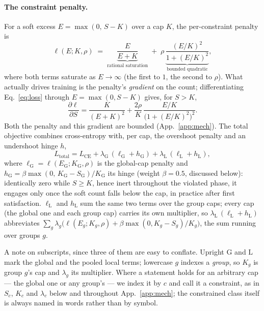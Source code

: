 \documentclass[10pt]{article}
\begin{document}
\paragraph{The constraint penalty.}
For a soft excess $E = \max(0,\, S - K)$ over a cap $K$, the per-constraint
penalty is
\begin{equation}
\label{eq:loss}
\ell(E;K,\rho)\;=\;\underbrace{\frac{E}{E+K}}_{\text{rational saturation}}
\;+\;\rho\,\underbrace{\frac{(E/K)^2}{1+(E/K)^2}}_{\text{bounded quadratic}} ,
\end{equation}
where both terms saturate as $E\!\to\!\infty$ (the first to $1$, the second
to $\rho$). What actually drives training is the penalty's \emph{gradient}
on the count; differentiating Eq.~\eqref{eq:loss} through $E=\max(0,S-K)$
gives, for $S>K$,
\begin{equation}
\label{eq:grad}
\frac{\partial \ell}{\partial S}
= \frac{K}{(E+K)^2} + \frac{2\rho}{K}\,\frac{E/K}{\bigl(1+(E/K)^2\bigr)^2}.
\end{equation}
Both the penalty and this gradient are bounded (App.~\ref{app:mech}). The
total objective combines cross-entropy with, per cap, the overshoot penalty
and an undershoot hinge $h$,
\begin{equation}
\label{eq:total}
L_{\text{total}} = L_{\text{CE}} + \lambda_{\mathrm{G}}\,(\ell_{\mathrm{G}} + h_{\mathrm{G}}) + \lambda_{\mathrm{L}}\,(\ell_{\mathrm{L}} + h_{\mathrm{L}}) ,
\end{equation}
where $\ell_{\mathrm{G}}=\ell(E_{\mathrm{G}};K_{\mathrm{G}},\rho)$ is the global-cap penalty and
$h_{\mathrm{G}}=\beta\max(0,\,K_{\mathrm{G}}-S_{\mathrm{G}})/K_{\mathrm{G}}$ its hinge (weight $\beta{=}0.5$, discussed below):
identically zero while $S\ge K$, hence inert throughout the violated phase,
it engages only once the soft count falls below the cap, in practice after
first satisfaction. $\ell_{\mathrm{L}}$ and $h_{\mathrm{L}}$ sum the same two terms over the
group caps; every cap (the global one and each group cap) carries its own
multiplier, so $\lambda_{\mathrm{L}}\,(\ell_{\mathrm{L}}+h_{\mathrm{L}})$ abbreviates
$\sum_g \lambda_g\bigl(\ell(E_g;K_g,\rho)+\beta\max(0,K_g-S_g)/K_g\bigr)$, the sum running over groups $g$.

{A note on subscripts, since three of them are easy to conflate.
Upright $\mathrm{G}$ and $\mathrm{L}$ mark the global and the pooled local terms;
lowercase $g$ indexes a \emph{group}, so $K_g$ is group $g$'s cap and
$\lambda_g$ its multiplier. Where a statement holds for an arbitrary cap --- the
global one or any group's --- we index it by $c$ and call it a constraint, as in
$S_c$, $K_c$ and $\lambda_c$ below and throughout App.~\ref{app:mech}; the
constrained class itself is always named in words rather than by symbol.}
\end{document}
